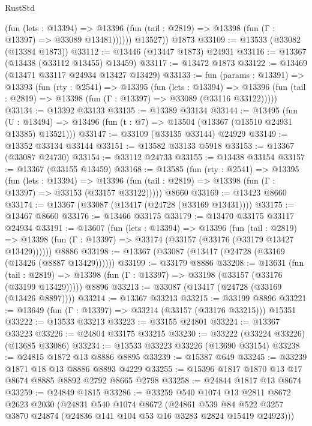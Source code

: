 \begin{lexlean}{RustStd}
\begin{coremodule}
              (fun (lets : @13394) =>
              @13396 (fun (tail : @2819) => @13398 (fun (Γ : @13397) => @33089 @13481))))))
        @13527))
    @1873
@33109 := @13533 (@33082 (@13384 @1873))
@33112 := @13446 (@13447 @1873) @24931
@33116 := @13367 (@13438 (@33112 @13455) @13459)
@33117 := @13472 @1873
@33122 := @13469 (@13471 @33117 @24934 @13427 @13429)
@33133 := fun (params : @13391) =>
  @13393
    (fun (rty : @2541) =>
    @13395
      (fun (lets : @13394) =>
      @13396 (fun (tail : @2819) => @13398 (fun (Γ : @13397) => @33089 (@33116 @33122)))))
@33134 := @13392 @33133
@33135 := @13389 @33134
@33144 := @13495
    (fun (U : @13494) => @13496 (fun (t : @7) => @13504 (@13367 (@13510 @24931 @13385) @13521)))
@33147 := @33109 (@33135 @33144) @24929
@33149 := @13352 @33134 @33144
@33151 := @13582 @33133 @5918
@33153 := @13367 (@33087 @24730)
@33154 := @33112 @24733
@33155 := @13438 @33154
@33157 := @13367 (@33155 @13459)
@33168 := @13585
    (fun (rty : @2541) =>
    @13395
      (fun (lets : @13394) =>
      @13396 (fun (tail : @2819) => @13398 (fun (Γ : @13397) => @33153 (@33157 @33122)))))
    @8660
@33169 := @13423 @8660
@33174 := @13367 (@33087 (@13417 (@24728 (@33169 @13431))))
@33175 := @13467 @8660
@33176 := @13466 @33175
@33179 := @13470 @33175 @33117 @24934
@33191 := @13607
    (fun (lets : @13394) =>
    @13396
      (fun (tail : @2819) =>
      @13398 (fun (Γ : @13397) => @33174 (@33157 (@33176 (@33179 @13427 @13429))))))
    @8886
@33198 := @13367 (@33087 (@13417 (@24728 (@33169 (@13426 (@8887 @13429))))))
@33199 := @33179 @8886
@33208 := @13631
    (fun (tail : @2819) => @13398 (fun (Γ : @13397) => @33198 (@33157 (@33176 (@33199 @13429)))))
    @8896
@33213 := @33087 (@13417 (@24728 (@33169 (@13426 @8897))))
@33214 := @13367 @33213
@33215 := @33199 @8896
@33221 := @13649 (fun (Γ : @13397) => @33214 (@33157 (@33176 @33215))) @15351
@33222 := @13533 @33213
@33223 := @33155 @24801
@33224 := @13367 @33223
@33226 := @24804 @33175 @33215
@33230 := @33222 (@33224 @33226) (@13685 @33086)
@33234 := @13533 @33223 @33226 (@13690 @33154)
@33238 := @24815 @1872 @13 @8886 @8895
@33239 := @15387 @649
@33245 := @33239 @1871 @18 @13 @8886 @8893 @4229
@33255 := @15396 @1817 @1870 @13 @17 @8674 @8885 @8892 @2792 @8665 @2798
@33258 := @24844 @1817 @13 @8674
@33259 := @24849 @1815
@33286 := @33259
    @540
    @1074
    @13
    @2811
    @8672
    @2623
    @2030
    (@24831
      @540
      @1074
      @8672
      (@24861
        @539
        @84
        @522
        @3257
        @3870
        @24874
        (@24836 @141 @104 @53 @16 @3283 @2824 @15419 @24923)))

\end{coremodule}
\end{lexlean}
